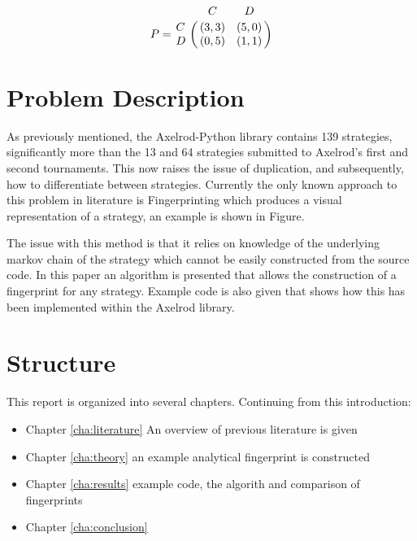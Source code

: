 \begin{equation}\label{eq:payoff_matrix}
%
P = \bordermatrix{~ & C & D \cr
                  C & (3, 3) & (5, 0) \cr
                  D & (0, 5) & (1, 1) \cr}
%
\end{equation}

\section{Problem Description}

As previously mentioned, the Axelrod-Python library contains 139 strategies, significantly more than the 13 and 64 strategies submitted to Axelrod's first and second tournaments.
This now raises the issue of duplication, and subsequently, how to differentiate between strategies.
Currently the only known approach to this problem in literature is Fingerprinting which produces a visual representation of a strategy, an example is shown in Figure. %

The issue with this method is that it relies on knowledge of the underlying markov chain of the strategy which cannot be easily constructed from the source code.
In this paper an algorithm is presented that allows the construction of a fingerprint for any strategy.
Example code is also given that shows how this has been implemented within the Axelrod library.



\section{Structure}
This report is organized into several chapters. Continuing from this introduction:

\begin{itemize}
    \item Chapter \ref{cha:literature} An overview of previous literature is given
    \item Chapter \ref{cha:theory} an example analytical fingerprint is constructed
    \item Chapter \ref{cha:results} example code, the algorith and comparison of fingerprints
    \item Chapter \ref{cha:conclusion}
\end{itemize}

